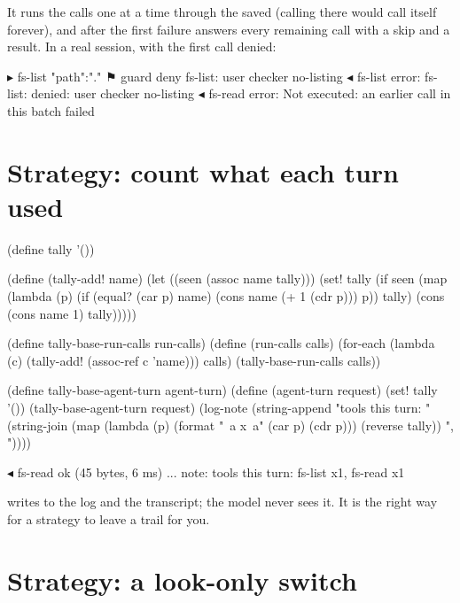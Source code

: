 It runs the calls one at a time through the saved 
(calling  there would call itself forever), and after the
first failure answers every remaining call with a skip and a result. In a real session, with
the first call denied:

\begin{txt}
▸ fs-list {"path":"."}
⚑ guard deny fs-list: user checker no-listing
◂ fs-list error: fs-list: denied: user checker no-listing
◂ fs-read error: Not executed: an earlier call in this batch failed
\end{txt}

\section{Strategy: count what each turn used}

\begin{scm}
(define tally '())

(define (tally-add! name)
  (let ((seen (assoc name tally)))
    (set! tally
          (if seen
              (map (lambda (p) (if (equal? (car p) name) (cons name (+ 1 (cdr p))) p))
                   tally)
              (cons (cons name 1) tally)))))

(define tally-base-run-calls run-calls)
(define (run-calls calls)
  (for-each (lambda (c) (tally-add! (assoc-ref c 'name))) calls)
  (tally-base-run-calls calls))

(define tally-base-agent-turn agent-turn)
(define (agent-turn request)
  (set! tally '())
  (tally-base-agent-turn request)
  (log-note (string-append "tools this turn: "
                           (string-join (map (lambda (p) (format "~a x~a" (car p) (cdr p)))
                                             (reverse tally))
                                        ", "))))
\end{scm}

\begin{txt}
◂ fs-read ok (45 bytes, 6 ms)
...
note: tools this turn: fs-list x1, fs-read x1
\end{txt}

 writes to the log and the transcript; the model never sees
it. It is the right way for a strategy to leave a trail for you.

\section{Strategy: a look-only switch}

